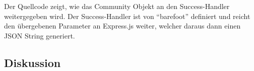 Der Quellcode  zeigt, wie das Community Objekt an den Success-Handler weitergegeben wird. Der Success-Handler ist von ``barefoot'' definiert und reicht den übergebenen Parameter an Express.js weiter, welcher daraus dann einen JSON String generiert.

\subsection*{Diskussion}
